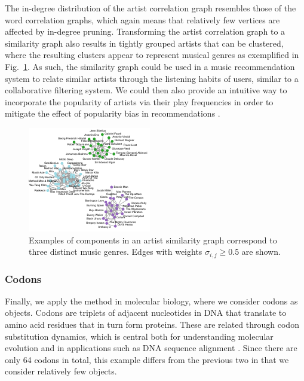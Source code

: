 \documentclass{kais}
\newcommand{\sy}[1]{\sigma_{#1}}
\begin{document}
The in-degree distribution of the artist correlation graph resembles those of the word correlation graphs,
which again means that relatively few vertices are affected by in-degree pruning. Transforming the artist correlation
graph to a similarity graph also results in tightly grouped artists that can be clustered, where the resulting
clusters appear to represent musical genres as exemplified in Fig.\ \ref{fig:artists}. As such, the similarity graph could
 be used in a music recommendation system to relate similar artists 
through the listening habits of users, similar to a collaborative filtering system. We could then also provide an
 intuitive way to incorporate the popularity of artists via their play frequencies in order to mitigate the 
 effect of popularity bias in recommendations \cite{celma2008hits}.

\begin{figure}
\centerline{\includegraphics[width=0.75\columnwidth]{figures/last-fm-example-3.pdf}}
\caption{Examples of components in an artist similarity graph correspond to three distinct music genres. Edges with weights $\sy{i,j} \geq 0.5$ are shown.}
\label{fig:artists}
\end{figure}

\subsubsection{Codons}

Finally, we apply the method in molecular biology, where we consider codons as objects. Codons are triplets of
adjacent nucleotides in DNA that translate to amino acid residues that in turn form proteins.  These are related
through codon substitution dynamics, which is central both for understanding molecular evolution and in applications
such as DNA sequence alignment \cite{Anisimova09}. Since there are only 64 codons in total, this example differs from
the previous two in that we consider relatively few objects.
\end{document}
